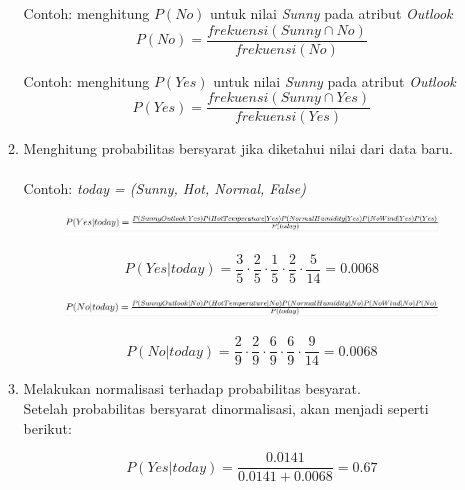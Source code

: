 \documentclass[a4paper,twoside]{article}
\begin{document}
\begin{enumerate}
\begin{enumerate}
Contoh: menghitung $P(No)$ untuk nilai \textit{Sunny} pada atribut \textit{Outlook}
\begin{equation}
P(No) = \frac{frekuensi(Sunny \cap No)}{frekuensi(No)}
\end{equation}

Contoh: menghitung $P(Yes)$ untuk nilai \textit{Sunny} pada atribut \textit{Outlook}
\begin{equation}
P(Yes) = \frac{frekuensi(Sunny \cap Yes)}{frekuensi(Yes)}
\end{equation}

\item Menghitung probabilitas bersyarat jika diketahui nilai dari data baru. \\\\
Contoh: \textit{today = (Sunny, Hot, Normal, False)}
\begin{figure}[H]
	\centering
	\includegraphics[scale=0.73]{naive_bayes3}
	\label{fig:naive_bayes3}
\end{figure}

\begin{equation}
P(Yes|today) = \frac{3}{5} \cdot \frac{2}{5} \cdot \frac{1}{5} \cdot \frac{2}{5} \cdot \frac{5}{14} = 0.0068
\end{equation}

\begin{figure}[H]
	\centering
	\includegraphics[scale=0.73]{naive_bayes4}
	\label{fig:naive_bayes4}
\end{figure}

\begin{equation}
P(No|today) = \frac{2}{9} \cdot \frac{2}{9} \cdot \frac{6}{9} \cdot \frac{6}{9} \cdot \frac{9}{14} = 0.0068
\end{equation}

\item Melakukan normalisasi terhadap probabilitas besyarat.\\

Setelah probabilitas bersyarat dinormalisasi, akan menjadi seperti berikut:

\begin{equation}
P(Yes|today) = \frac{0.0141}{0.0141 + 0.0068} = 0.67
\end{equation}


\end{enumerate}
\end{enumerate}
\end{document}
